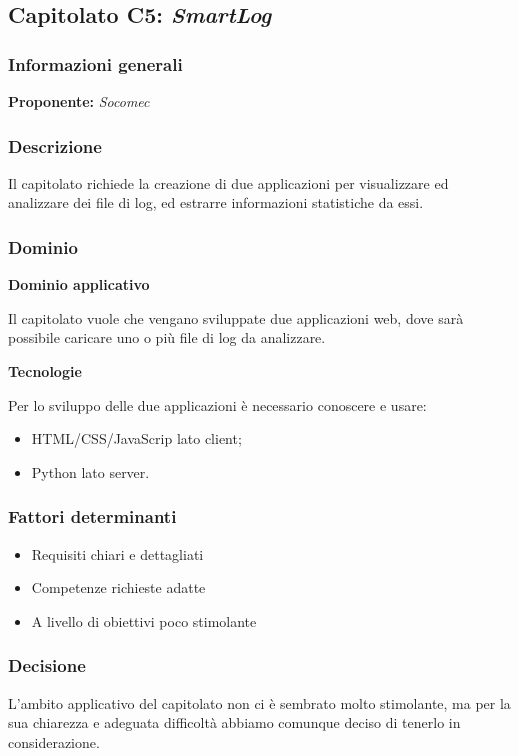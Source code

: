 \subsection{Capitolato C5: \textit{SmartLog}}

\subsubsection{Informazioni generali}

\textbf{Proponente:} \textit{Socomec}

\subsubsection{Descrizione}
Il capitolato richiede la creazione di due applicazioni per visualizzare ed analizzare dei file di log, ed estrarre informazioni statistiche da essi.

\subsubsection{Dominio}

\textbf{Dominio applicativo}

Il capitolato vuole che vengano sviluppate due applicazioni web, dove sarà possibile caricare uno o più file di log da analizzare.

\textbf{Tecnologie}

Per lo sviluppo delle due applicazioni è necessario conoscere e usare:
\begin{itemize}
    \item HTML/CSS/JavaScrip lato client;
    \item Python lato server.
\end{itemize}

\subsubsection{Fattori determinanti}
\begin{itemize}
    \item Requisiti chiari e dettagliati
    \item Competenze richieste adatte
    \item A livello di obiettivi poco stimolante
\end{itemize}

\subsubsection{Decisione}
L'ambito applicativo del capitolato non ci è sembrato molto stimolante, ma per la sua chiarezza e adeguata difficoltà abbiamo comunque deciso di tenerlo in considerazione.
